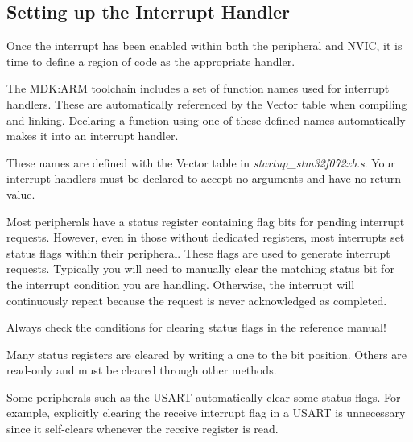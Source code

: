 \documentclass[11pt,fleqn]{book} %
\begin{document}
\subsection{Setting up the Interrupt Handler}  \label{handler_setup}
Once the interrupt has been enabled within both the peripheral and NVIC, it is time to define a region of code as the appropriate handler. 

The MDK:ARM toolchain includes a set of function names used for interrupt handlers. These are automatically referenced by the Vector table when compiling and linking. Declaring a function using one of these defined names automatically makes it into an interrupt handler.

These names are defined with the Vector table in \textit{startup\_stm32f072xb.s}. Your interrupt handlers must be declared to accept no arguments and have no return value. 

Most peripherals have a status register containing flag bits for pending interrupt requests. However, even in those without dedicated registers, most interrupts set status flags within their peripheral. These flags are used to generate interrupt requests. Typically you will need to manually clear the matching status bit for the interrupt condition you are handling. Otherwise, the interrupt will continuously repeat because the request is never acknowledged as completed. 

\begin{warning}
    Always check the conditions for clearing status flags in the reference manual!
    
    Many status registers are cleared by writing a one to the bit position. Others are read-only and must be cleared through other methods. 
    
    Some peripherals such as the USART automatically clear some status flags. For example, explicitly clearing the receive interrupt flag in a USART is unnecessary since it self-clears whenever the receive register is read. 
\end{warning}

\end{document}
